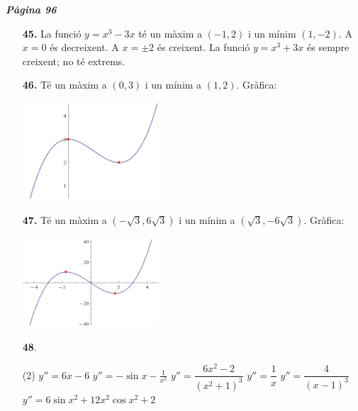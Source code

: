 \documentclass[a4paper, pdf, twoside]{book}
\begin{document}

{\textbf{\em Pàgina 96}} \hrulefill
\begin{enumerate}
\vspace{0.25cm}
\item[\fontfamily{phv}\selectfont\color{blue}\textbf{45. }] 
La funció $y = x^3 - 3x$ té un màxim a $(-1,2)$ i un mínim $(1,-2)$. A $x=0$ és decreixent. A $x=\pm 2$ és creixent. La funció $y = x^3 + 3x$ és sempre creixent; no té extrems. 
 \end{enumerate}
\begin{enumerate}
\vspace{0.25cm}
\item[\fontfamily{phv}\selectfont\color{blue}\textbf{46. }] 
Té un màxim a $(0,3)$ i un mínim a $(1,2)$. Gràfica:\par \includegraphics [width=0.4\textwidth ]{img-sol/t7-47}
\vspace{0.25cm}
\item[\fontfamily{phv}\selectfont\color{blue}\textbf{47. }] 
Té un màxim a $(-\sqrt {3},6\sqrt {3})$ i un mínim a $(\sqrt {3},-6\sqrt {3})$. Gràfica:\par \includegraphics [width=0.4\textwidth ]{img-sol/t7-48}
\vspace{0.25cm}



 \item[\fontfamily{phv}\selectfont\color{blue}\textbf{48}. ] 
 \begin{tasks}[column-sep=1em, item-indent=1.3333em](2)
	 \task $y''=6x-6$
	 \task $y''=-\sin x -\frac {1}{x^2}$
	 \task $y''=\dfrac {6x^2-2}{(x^2+1)^3}$
	 \task $y''=\dfrac {1}{x}$
	 \task $y''=\dfrac {4}{(x-1)^3}$
	 \task $y''=6\sin x^2 + 12 x^2 \cos x^2 + 2$
\end{tasks}
 \end{enumerate}
\vspace{0.3cm}
\end{document}
